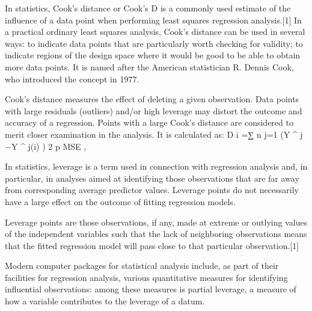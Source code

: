 In statistics, Cook's distance or Cook's D is a commonly used estimate of the influence of a data point when performing least squares regression analysis.[1] In a practical ordinary least squares analysis, Cook's distance can be used in several ways: to indicate data points that are particularly worth checking for validity; to indicate regions of the design space where it would be good to be able to obtain more data points. It is named after the American statistician R. Dennis Cook, who introduced the concept in 1977.
 
 
Cook's distance measures the effect of deleting a given observation. Data points with large residuals (outliers) and/or high leverage may distort the outcome and accuracy of a regression. Points with a large Cook's distance are considered to merit closer examination in the analysis. It is calculated as:
 D i =∑ n j=1 (Y ^  j  −Y ^  j(i) ) 2  p MSE  , 


In statistics, leverage is a term used in connection with regression analysis and, in particular, in analyses aimed at identifying those observations that are far away from corresponding average predictor values. Leverage points do not necessarily have a large effect on the outcome of fitting regression models.
 
Leverage points are those observations, if any, made at extreme or outlying values of the independent variables such that the lack of neighboring observations means that the fitted regression model will pass close to that particular observation.[1]
 
Modern computer packages for statistical analysis include, as part of their facilities for regression analysis, various quantitative measures for identifying influential observations: among these measures is partial leverage, a measure of how a variable contributes to the leverage of a datum.
